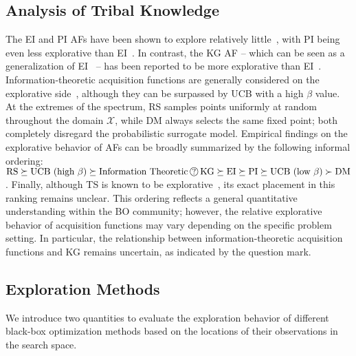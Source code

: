 \documentclass[accepted]{uai2025}
\begin{document}
\subsection{Analysis of Tribal Knowledge}
\label{sec:analysis_of_tribal_knowledge}
The \ac{EI} and \ac{PI} \acp{AF} have been shown to explore relatively little~\citep{de2021greed}, with \ac{PI} being even less explorative than \ac{EI}~\citep{benjamins2022pi}. In contrast, the \ac{KG} \ac{AF} -- which can be seen as a generalization of \ac{EI}~\citep[p.\ 12]{wu2017knowledge} -- has been reported to be more explorative than \ac{EI}~\citep[p.\ 89]{frazier2009knowledge}. Information-theoretic acquisition functions are generally considered on the explorative side~\citep{hernandez2014predictive}, although they can be surpassed by \ac{UCB} with a high $\beta$ value. At the extremes of the spectrum, \ac{RS} samples points uniformly at random throughout the domain $\mathcal{X}$, while \ac{DM} always selects the same fixed point; both completely disregard the probabilistic surrogate model. Empirical findings on the explorative behavior of \acp{AF} can be broadly summarized by the following informal ordering: $ \text{RS} \succeq \text{UCB (high $\beta$)} \succeq \text{Information Theoretic}\,\raisebox{.5pt}{\textcircled{\raisebox{-.9pt}{\small ?}}}\,\text{KG} \succeq \text{EI} \succeq \text{PI} \succeq \text{UCB (low $\beta$)} \succ \text{DM} $. Finally, although \ac{TS} is known to be explorative~\citep{do2024epsilon}, its exact placement in this ranking remains unclear. This ordering reflects a general quantitative understanding within the \ac{BO} community; however, the relative explorative behavior of acquisition functions may vary depending on the specific problem setting. In particular, the relationship between information-theoretic acquisition functions and \ac{KG} remains uncertain, as indicated by the question mark.



\subsection{Exploration Methods}

We introduce two quantities to evaluate the exploration behavior of different black-box optimization methods based on the locations of their observations in the search space.
\end{document}

